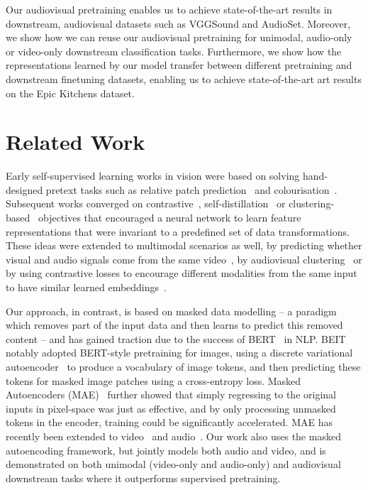 \documentclass[10pt,twocolumn,letterpaper]{article}
\begin{document}
Our audiovisual pretraining enables us to achieve state-of-the-art results in downstream, audiovisual datasets such as VGGSound and AudioSet.
Moreover, we show how we can reuse our audiovisual pretraining for unimodal, \ie audio-only or video-only downstream classification tasks.
Furthermore, we show how the representations learned by our model transfer between different pretraining and downstream finetuning datasets, enabling us to achieve state-of-the-art art results on the Epic Kitchens dataset.


 \vspace{-0.45\baselineskip}
\section{Related Work}
\vspace{-0.35\baselineskip}

Early self-supervised learning works in vision were based on solving hand-designed pretext tasks such as relative patch prediction~\cite{doersch2015unsupervised} and colourisation~\cite{zhang2016colorful}. Subsequent works converged on contrastive~\cite{chen2020asimple, hadsell2006dimensionality, he2020momentum, oord2018representation}, self-distillation~\cite{grill2020bootstrap, caron2021emerging, lee2021compressive} or clustering-based~\cite{caron2018deep, asano2020self} objectives that encouraged a neural network to learn feature representations that were invariant to a predefined set of data transformations.
These ideas were extended to multimodal scenarios as well, by predicting whether visual and audio signals come from the same video~\cite{arandjelovic2017look, arandjelovic2018objects,owens2018audio,korbar2018cooperative}, by audiovisual clustering~\cite{alwassel2020self,asano2020labelling} or by using contrastive losses to encourage different modalities from the same input to have similar learned embeddings~\cite{akbari2021vatt, alayrac2020self, miech2020end, patrick2021compositions, zellers2021merlot, wang2021multimodal}.

Our approach, in contrast, is based on masked data modelling -- a paradigm which removes part of the input data and then learns to predict this removed content -- and has gained traction due to the success of BERT~\cite{devlin_naacl_2019} in NLP.
BEIT~\cite{bao2021beit} notably adopted BERT-style pretraining for images, using a discrete variational autoencoder~\cite{ramesh2021zero} to produce a vocabulary of image tokens, and then predicting these tokens for masked image patches using a cross-entropy loss.
Masked Autoencoders (MAE)~\cite{he2022masked} further showed that simply regressing to the original inputs in pixel-space was just as effective, and  by only processing unmasked tokens in the encoder, training could be significantly accelerated.
MAE has recently been extended to video~\cite{feichtenhofer2022masked,tong2022videomae,wang2022bevt} and audio~\cite{chong2022masked,xu2022masked}.
Our work also uses the masked autoencoding framework, but jointly models both audio and video, and is demonstrated on both unimodal (\ie video-only and audio-only) and audiovisual downstream tasks where it outperforms supervised pretraining. 
\end{document}
